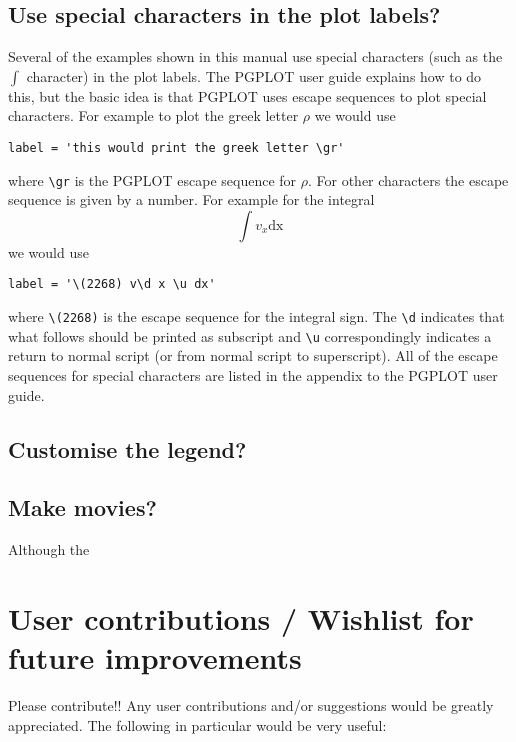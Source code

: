 \documentclass[a4paper,12pt]{article}
\begin{document}
\subsection{Use special characters in the plot labels?}
 Several of the examples shown in this manual use special characters (such as
the $\int$ character) in the plot labels. The PGPLOT user guide explains how to do
this, but the basic idea is that PGPLOT uses escape sequences to plot special
characters. For example to plot the greek letter $\rho$ we would use
\begin{verbatim}
label = 'this would print the greek letter \gr'
\end{verbatim}
where \verb+\gr+ is the PGPLOT escape sequence for $\rho$. For other
characters the escape sequence is given by a number. For example for the integral 
\begin{equation}
\int v_x \mathrm{dx}
\end{equation}
we would use
\begin{verbatim}
label = '\(2268) v\d x \u dx'
\end{verbatim}
where \verb+\(2268)+ is the escape sequence for the integral sign. The
\verb+\d+ indicates that what follows should be printed as subscript and
\verb+\u+ correspondingly indicates a return to normal script (or from normal script to
superscript). All of the escape sequences for special characters are listed in
the appendix to the PGPLOT user guide.

\subsection{Customise the legend?}

\subsection{Make movies?}
 Although the 

\section{User contributions / Wishlist for future improvements}
 Please contribute!! Any user contributions and/or suggestions would be greatly
appreciated. The following in particular would be very useful:
\end{document}
